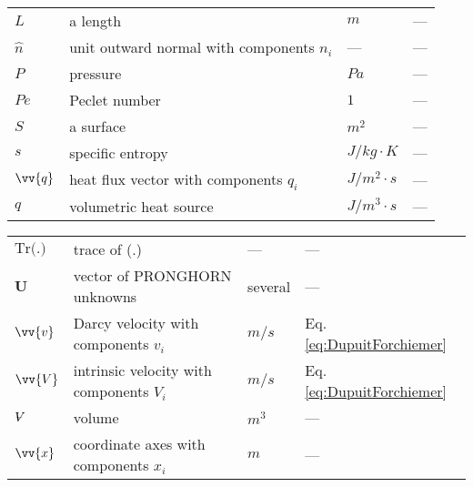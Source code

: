 \documentclass[10pt]{article}
\newcommand{\volume}{\mathop{\ooalign{\hfil$V$\hfil\cr\kern0.08em--\hfil\cr}}\nolimits}
\numberwithin{equation}{section} %
\begin{document}
\begin{tabular}{l l l l}
\(L\)					& a length									& \(m\)				& ---\\
\(\hat{n}\)				& unit outward normal with components \(n_i\)		& ---					& ---\\
\(P\)					& pressure								& \(Pa\)				& ---\\
\(Pe\)				& Peclet number							& \(1\)				& ---\\
\(S\)					& a surface								& \(m^2\)				& ---\\
\(s\)					& specific entropy							& \(J/kg\cdot K\)		& ---\\
\(\vv{q}\)				& heat flux vector with components \(q_i\)			& \(J/m^2\cdot s\)		& ---\\
\(q\)					& volumetric heat source						& \(J/m^3\cdot s\)		& ---\\
\end{tabular}

\begin{tabular}{l l l l}
\(\textrm{Tr(.)}\)			& trace of (.)								& ---					& ---\\
\(\textbf{U}\)			& vector of PRONGHORN unknowns			& several				& ---\\
\(\vv{v}\)				& Darcy velocity with components \(v_i\)			&\(m/s\)				& Eq. \eqref{eq:DupuitForchiemer}\\
\(\vv{V}\)				& intrinsic velocity with components \(V_i\)			&\(m/s\)				& Eq. \eqref{eq:DupuitForchiemer}\\
\(\volume\)			& volume									&\(m^3\)				& ---\\
\(\vv{x}\)				& coordinate axes with components \(x_i\)			& \(m\)				& ---\\
\end{tabular}
\end{document}
